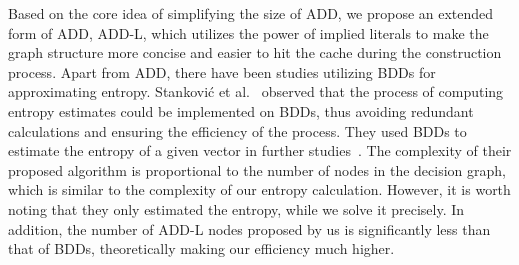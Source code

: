 Based on the core idea of simplifying the size of ADD, we propose an extended form of ADD, ADD-L, which utilizes the power of implied literals to make the graph structure more concise and easier to hit the cache during the construction process.
Apart from ADD, there have been studies utilizing BDDs for approximating entropy.
Stanković et al.~\cite{stankoviccomputing} observed that the process of computing entropy estimates could be implemented on BDDs, thus avoiding redundant calculations and ensuring the efficiency of the process.
They used BDDs to estimate the entropy of a given vector in further studies~\cite{stankovic2007calculating}.
The complexity of their proposed algorithm is proportional to the number of nodes in the decision graph, which is similar to the complexity of our entropy calculation. However, it is worth noting that they only estimated the entropy, while we solve it precisely. 
In addition, the number of ADD-L nodes proposed by us is significantly less than that of BDDs, theoretically making our efficiency much higher.



\begin{comment}
	An efficient approach is trying to find the most concise factorization of the function that computes marginal probabilities, which is also referred to as Knowledge Compilation.
	Numerous target representations have been used to concisely model probability distributions, providing more concise factorizations than Bayesian networks in the presence of local structure\cite{dal2021compositional}.
	Examples include d-DNNF~\cite{chavira2006compiling}, Sentential Decision Diagrams (SDD)~\cite{choi2013compiling}, Probabilistic SDDs (PSDD)~\cite{kisa2014probabilistic}, Reduced Ordered Binary Decision Diagrams (ROBDD)~\cite{nielsen2013using}, Zero-suppressed BDDs (ZBDD)~\cite{minato2007compiling}, And/Or Multi-Valued Decision Diagrams (AOMDDs)~\cite{mateescu2008and}, Probabilistic Decision Graphs (PDG)~\cite{jaeger2004probabilistic}, Weighted Positive BDDs (WPBDD)~\cite{dal2017weighted}, Algebraic Decision Diagrams (ADD)~\cite{dudek2020addmc}, among others.
	
\end{comment}



